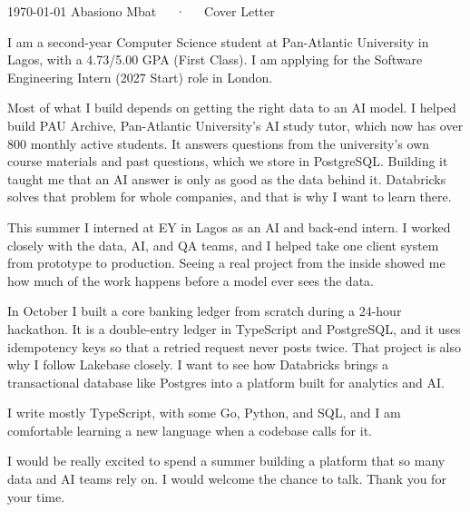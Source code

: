 \documentclass[11pt, a4paper]{awesome-cv}
\begin{document}
\makecvheader[C]

\makecvfooter
  {\today}
  {Abasiono Mbat~~~·~~~Cover Letter}
  {}

\makelettertitle

\begin{cvletter}

I am a second-year Computer Science student at Pan-Atlantic University in Lagos, with a 4.73/5.00 GPA (First Class). I am applying for the Software Engineering Intern (2027 Start) role in London.

Most of what I build depends on getting the right data to an AI model. I helped build PAU Archive, Pan-Atlantic University's AI study tutor, which now has over 800 monthly active students. It answers questions from the university's own course materials and past questions, which we store in PostgreSQL. Building it taught me that an AI answer is only as good as the data behind it. Databricks solves that problem for whole companies, and that is why I want to learn there.

This summer I interned at EY in Lagos as an AI and back-end intern. I worked closely with the data, AI, and QA teams, and I helped take one client system from prototype to production. Seeing a real project from the inside showed me how much of the work happens before a model ever sees the data.

In October I built a core banking ledger from scratch during a 24-hour hackathon. It is a double-entry ledger in TypeScript and PostgreSQL, and it uses idempotency keys so that a retried request never posts twice. That project is also why I follow Lakebase closely. I want to see how Databricks brings a transactional database like Postgres into a platform built for analytics and AI.

I write mostly TypeScript, with some Go, Python, and SQL, and I am comfortable learning a new language when a codebase calls for it.

I would be really excited to spend a summer building a platform that so many data and AI teams rely on. I would welcome the chance to talk. Thank you for your time.

\end{cvletter}

\makeletterclosing
\end{document}
